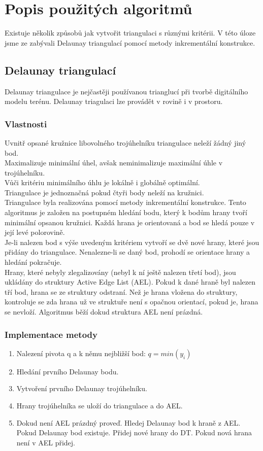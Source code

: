 \documentclass[a4paper, 12pt]{article}
\begin{document}
\section{Popis použitých algoritmů}
Existuje několik způsobů jak vytvořit triangulaci s různými kritérii. V této úloze jsme ze zabývali Delaunay triangulací pomocí metody inkrementální konstrukce.

\subsection{Delaunay triangulací}
Delaunay triangulace je nejčastěji používanou trianglucí při tvorbě digitálního modelu terénu. Delaunay triagulaci lze provádět v rovině i v prostoru.
\\
\subsubsection{Vlastnosti}
Uvnitř opsané kružnice libovolného trojúhelníku triangulace neleží žádný jiný bod.
\\
Maximalizuje minimální úhel, avšak neminimalizuje maximální úhle v trojúhelníku.
\\
Vůči kritériu minimálního úhlu je lokálně i globálně optimální.
\\
Triangulace je jednoznačná pokud čtyři body neleží na kružnici.
\\

Triangulace byla realizována pomocí metody inkrementální konstrukce. Tento algoritmus je založen na postupném hledání bodu, který k bodům hrany tvoří minimální opsanou kružnici. Každá hrana je orientovaná a bod se hledá pouze v její levé polorovině.\\
Je-li nalezen bod s výše uvedeným kritériem vytvoří se dvě nové hrany, které jsou přidány do triangulace. Nenalezne-li se daný bod, prohodí se orientace hrany a hledání pokračuje.\\
Hrany, které nebyly zlegalizovány (nebyl k ní ještě nalezen třetí bod), jsou ukládány do struktury Active Edge List (AEL). Pokud k dané hraně byl nalezen tří bod, hrana se ze struktury odstraní. Než je hrana vložena do struktury, kontroluje se zda hrana už ve struktuře není s opačnou orientací, pokud je, hrana se nevloží. Algoritmus běží dokud struktura AEL není prázdná.

\subsubsection{Implementace metody}
\begin{enumerate}
\item Nalezení pivota q a k němu nejbližší bod:  $ q = min(y_i) $ 
\item Hledání prvního Delaunay bodu.
\item Vytvoření prvního Delaunay trojúhelníku.
\item Hrany trojúhelníka se uloží do triangulace a do AEL.
\item Dokud není AEL prázdný proveď.
\subitem Hledej Delaunay bod k hraně z AEL.
\subitem Pokud Delaunay bod existuje.
\subsubitem Přidej nové hrany do DT.
\subsubitem Pokud nová hrana není v AEL přidej.
\end{enumerate}
\end{document}
